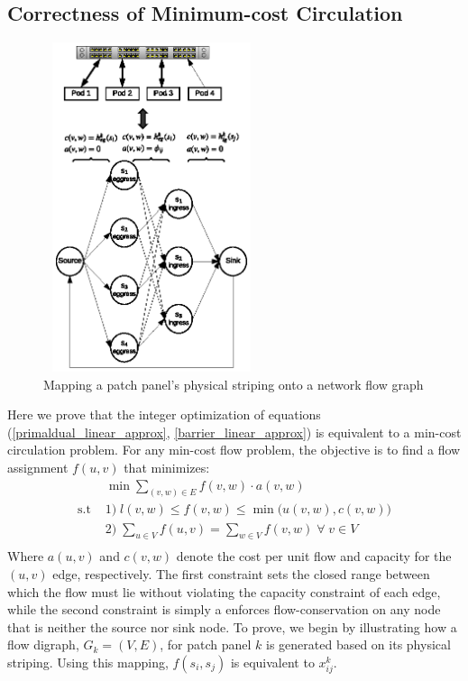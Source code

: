 \documentclass[sigconf]{acmart}
\theoremstyle{definition}
\begin{document}
\begin{appendices}
\subsection{Correctness of Minimum-cost Circulation}\label{appendix:mincost_flow}
\begin{figure}[ht!]
    \centering
    \includegraphics[width=2.5in,height=3.8in,trim={1.3cm 0.6cm 1.3cm 0cm}]{./figures/mincost_circulation_mapping}
    \caption{Mapping a patch panel's physical striping onto a network flow graph}
    \label{fig:mincost_circulation_mapping}
\end{figure}
Here we prove that the integer optimization of equations (\ref{primaldual_linear_approx}, \ref{barrier_linear_approx}) is equivalent to a min-cost circulation problem. For any min-cost flow problem, the objective is to find a flow assignment $f(u,v)$ that minimizes:
\begin{equation}
\begin{aligned}
&\min \sum\limits_{(v, w) \in E} f(v,w) \cdot a(v,w)\\
\text{s.t } & 1) \; l(v, w) \leq f(v, w) \leq \min\big(u(v,w), c(v,w)\big)\\
            & 2) \; \sum\limits_{u \in V} f(u, v) = \sum\limits_{w \in V} f(v, w) \; \forall \; v \in V \\ 
\end{aligned}\label{equation:min_cost_circulation_theoretical}
\end{equation}
Where $a(u, v)$ and $c(v,w)$ denote the cost per unit flow and capacity for the $(u,v)$ edge, respectively. The first constraint sets the closed range between which the flow must lie without violating the capacity constraint of each edge, while the second constraint is simply a enforces flow-conservation on any node that is neither the source nor sink node. To prove, we begin by illustrating how a flow digraph, $G_k= (V, E)$, for patch panel $k$ is generated based on its physical striping. Using this mapping, $f(s_i, s_j)$ is equivalent to $x_{ij}^k$.


\end{appendices}
\end{document}
